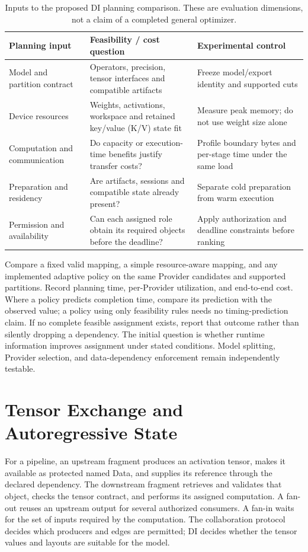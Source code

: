 \begin{table}[htbp]\centering\small
\caption{Inputs to the proposed DI planning comparison. These are evaluation dimensions, not a claim of a completed general optimizer.}
\begin{tabularx}{\textwidth}{p{}XX}
\toprule Planning input & Feasibility / cost question & Experimental control\\\midrule
Model and partition contract & Operators, precision, tensor interfaces and compatible artifacts & Freeze model/export identity and supported cuts\\\midrule
Device resources & Weights, activations, workspace and retained key/value (K/V) state fit & Measure peak memory; do not use weight size alone\\\midrule
Computation and communication & Do capacity or execution-time benefits justify transfer costs? & Profile boundary bytes and per-stage time under the same load\\\midrule
Preparation and residency & Are artifacts, sessions and compatible state already present? & Separate cold preparation from warm execution\\\midrule
Permission and availability & Can each assigned role obtain its required objects before the deadline? & Apply authorization and deadline constraints before ranking\\\bottomrule
\end{tabularx}\end{table}

Compare a fixed valid mapping, a simple resource-aware mapping, and any implemented adaptive policy on the same Provider candidates and supported partitions. Record planning time, per-Provider utilization, and end-to-end cost. Where a policy predicts completion time, compare its prediction with the observed value; a policy using only feasibility rules needs no timing-prediction claim. If no complete feasible assignment exists, report that outcome rather than silently dropping a dependency. The initial question is whether runtime information improves assignment under stated conditions. Model splitting, Provider selection, and data-dependency enforcement remain independently testable.

\section{Tensor Exchange and Autoregressive State}
For a pipeline, an upstream fragment produces an activation tensor, makes it available as protected named Data, and supplies its reference through the declared dependency. The downstream fragment retrieves and validates that object, checks the tensor contract, and performs its assigned computation. A fan-out reuses an upstream output for several authorized consumers. A fan-in waits for the set of inputs required by the computation. The collaboration protocol decides which producers and edges are permitted; DI decides whether the tensor values and layouts are suitable for the model.

